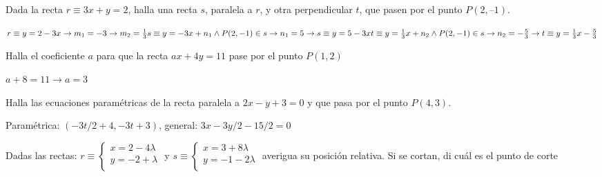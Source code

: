 \documentclass[spanish, 11pt]{exam}
\begin{document}
\begin{questions}
\begin{multicols}{2}
\end{multicols}


\question Dada la recta $r\equiv 3x + y = 2$, halla una recta $s$, paralela a $r$, y otra perpendicular $t$, que pasen por el punto $P(2, – 1)$.
\begin{solution} $r\equiv y=2-3x \to m_1=-3 \to m_2=\frac{1}{3}\\ s\equiv y=-3x+n_1 \land P(2,-1) \in s \to n_1=5 \to s\equiv y=5-3x \\
t\equiv y=\frac{1}{3}x+n_2 \land P(2,-1) \in s \to n_2=-\frac{5}{3} \to t\equiv y=\frac{1}{3}x-\frac{5}{3} \\ $\end{solution}

\question Halla el coeficiente $a$ para que la recta $ax + 4y = 11$ pase por el punto $P(1, 2)$
\begin{solution} $ a+8=11 \to a=3$ \end{solution}



\question Halla las ecuaciones paramétricas de la recta paralela a $2x - y + 3 = 0 $ y que pasa por el punto $P(4, 3)$.
\begin{solution} Paramétrica: $(-3t/2 + 4, -3t + 3)$, general: $3x - 3y/2 - 15/2=0$\end{solution}


\question Dadas las rectas:  $r \equiv \left\{ 
    {\begin{matrix}
	   {x = 2 - 4\lambda }  \\ 
	   {y =  - 2 + \lambda}  \\ 
    \end{matrix} } \right.$ 	y 	
    $s \equiv \left\{ {\begin{matrix}
   {x = 3 + 8\lambda }  \\ 
   {y =  - 1 - 2\lambda }  \\ 
\end{matrix} } \right.$  averigua su posición relativa. Si se cortan, di cuál es el punto de corte



\end{questions}
\end{document}
